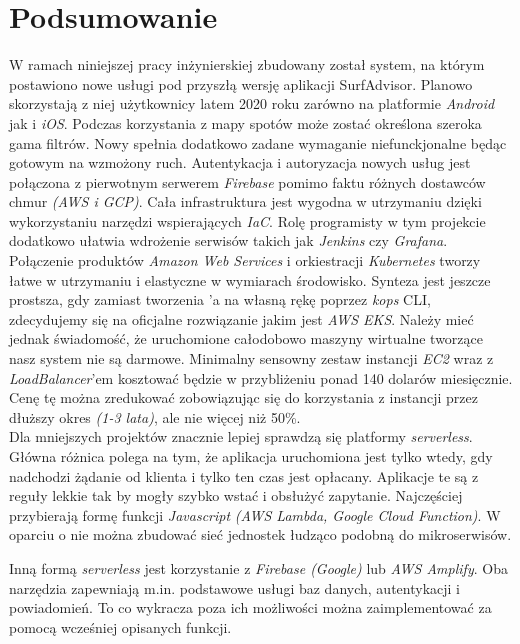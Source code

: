 \chapter{Podsumowanie}
\label{cha:summary}

W ramach niniejszej pracy inżynierskiej zbudowany został system, na którym postawiono nowe usługi pod przyszłą wersję aplikacji SurfAdvisor.
Planowo skorzystają z niej użytkownicy latem 2020 roku zarówno na platformie \emph{Android} jak i \emph{iOS}. 
Podczas korzystania z mapy spotów może zostać określona szeroka gama filtrów. 
Nowy  spełnia dodatkowo zadane wymaganie niefunckjonalne będąc gotowym na wzmożony ruch.
Autentykacja i autoryzacja nowych usług jest połączona z pierwotnym serwerem \emph{Firebase} pomimo faktu różnych dostawców chmur \emph{(AWS i GCP)}.
Cała infrastruktura jest wygodna w utrzymaniu dzięki wykorzystaniu narzędzi wspierających \emph{IaC}.
Rolę programisty w tym projekcie dodatkowo ułatwia wdrożenie serwisów takich jak \emph{Jenkins} czy \emph{Grafana}.\\


Połączenie produktów \emph{Amazon Web Services} i orkiestracji \emph{Kubernetes} tworzy łatwe w utrzymaniu i elastyczne w wymiarach środowisko.
Synteza jest jeszcze prostsza, gdy zamiast tworzenia 'a na własną rękę poprzez \emph{kops} CLI, zdecydujemy się na oficjalne rozwiązanie jakim jest \emph{AWS EKS}.
Należy mieć jednak świadomość, że uruchomione całodobowo maszyny wirtualne tworzące nasz system nie są darmowe.
Minimalny sensowny zestaw instancji \emph{EC2} wraz z \emph{LoadBalancer}'em kosztować będzie w przybliżeniu ponad 140 dolarów miesięcznie.
Cenę tę można zredukować zobowiązując się do korzystania z instancji przez dłuższy okres \emph{(1-3 lata)}, ale nie więcej niż 50\%.\\


Dla mniejszych projektów znacznie lepiej sprawdzą się platformy \emph{serverless}.
Główna różnica polega na tym, że aplikacja uruchomiona jest tylko wtedy, gdy nadchodzi żądanie od klienta i tylko ten czas jest opłacany.
Aplikacje te są z reguły lekkie tak by mogły szybko wstać i obsłużyć zapytanie.
Najczęściej przybierają formę funkcji \emph{Javascript} \emph{(AWS Lambda, Google Cloud Function)}.
W oparciu o nie można zbudować sieć jednostek łudząco podobną do mikroserwisów.


Inną formą \emph{serverless} jest korzystanie z \emph{Firebase (Google)} lub \emph{AWS Amplify}.
Oba narzędzia zapewniają m.in. podstawowe usługi baz danych, autentykacji i powiadomień.
To co wykracza poza ich możliwości można zaimplementować za pomocą wcześniej opisanych funkcji.






